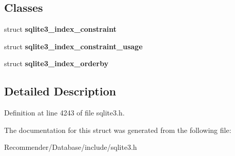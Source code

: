 \subsection*{Classes}
\begin{CompactItemize}
\item 
struct {\bf sqlite3\_\-index\_\-constraint}
\item 
struct {\bf sqlite3\_\-index\_\-constraint\_\-usage}
\item 
struct {\bf sqlite3\_\-index\_\-orderby}
\end{CompactItemize}


\subsection{Detailed Description}




Definition at line 4243 of file sqlite3.h.

The documentation for this struct was generated from the following file:\begin{CompactItemize}
\item 
Recommender/Database/include/sqlite3.h\end{CompactItemize}
